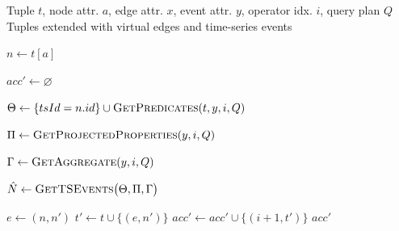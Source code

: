 \begin{algorithm}[t]
\footnotesize
\caption{\textsc{QueryTSOpt}}
\label{alg:query-ts}
\begin{algorithmic}[1]

\Require Tuple $t$, node attr. $a$, edge attr. $x$, event attr. $y$, operator idx. $i$, query plan $Q$
\Ensure Tuples extended with virtual edges and time-series events

\label{proc:query-ts-opt}

    \State $n \gets t[a]$
    \label{line:qts:get-node}

    \State $acc' \gets \varnothing$
    \label{line:qts:init}

    \State $\Theta \gets \{tsId=n.id\}\cup\textsc{GetPredicates}(t,y,i,Q)$
    \label{line:qts:predicates}

    \State $\Pi \gets \textsc{GetProjectedProperties}(y,i,Q)$
    \label{line:qts:projections}

    \State $\Gamma \gets \textsc{GetAggregate}(y,i,Q)$
    \label{line:qts:aggregate}

    \State $\hat{N} \gets
    \textsc{GetTSEvents}
    \bigl(\Theta,\Pi,\Gamma\bigr)$
    \label{line:qts:query}

    \label{line:qts:iterate}
        \State $e \gets (n,n')$
        \label{line:qts:create-edge}
        \State $t' \gets t \cup \{(e,n')\}$
        \label{line:qts:extend}
        \State $acc' \gets acc' \cup \{(i+1,t')\}$
        \label{line:qts:accumulate}
    \EndFor
    \State \Return $acc'$
    \label{line:qts:return}
\EndProcedure
\end{algorithmic}
\end{algorithm}

